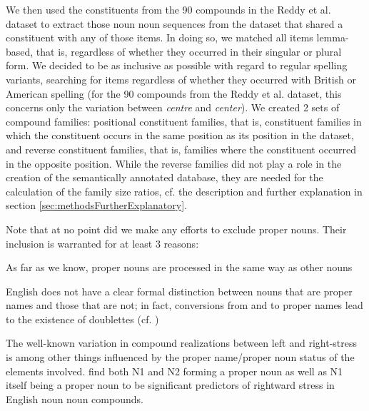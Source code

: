 %
We then used the constituents from the 90 compounds in the Reddy et al. dataset to extract
those noun noun sequences from the  dataset that shared a constituent with any of those items. In
doing so, we matched all items lemma-based, that is, regardless of whether they occurred in
their singular or plural form. We decided to be as inclusive as
possible with regard to regular spelling variants, searching for items
regardless of whether they occurred with British or
American spelling (for the 90 compounds from the Reddy et al. dataset,
this concerns only the variation between \emph{centre} and \emph{center}). 
We created 2 sets of compound families: positional constituent families,
that is, constituent families in which the constituent occurs in the
same position as its position in the dataset, and reverse constituent
families, that is, families where the constituent occurred in the
opposite position. While the reverse families did not play a role in
the creation of the semantically annotated database, they are needed
for the calculation of the family size ratios, cf. the description and
further explanation in
section \ref{sec:methodsFurtherExplanatory}.

Note that at no point did we make any efforts to exclude proper
nouns. Their inclusion is warranted for at least 3 reasons:
\begin{inparaenum}[(1)]
\item As far as we know, proper nouns are processed in the same way as
  other nouns
\item English does not have a clear formal distinction between nouns
  that are proper
  names and those that are not; in fact, conversions
  from and to proper names lead to the existence of 
  doublettes (cf. \citealt[516]{HuddlestonandPullum:2002})
\item The well-known variation in compound realizations between left
  and right-stress is among other things influenced by the proper
  name/proper noun status of the elements involved. \citet[779]{Plagetal:2008} find both N1 and N2
  forming a proper noun as well as N1 itself being a proper noun to be
  significant predictors of rightward stress in English noun noun compounds.
\end{inparaenum}

